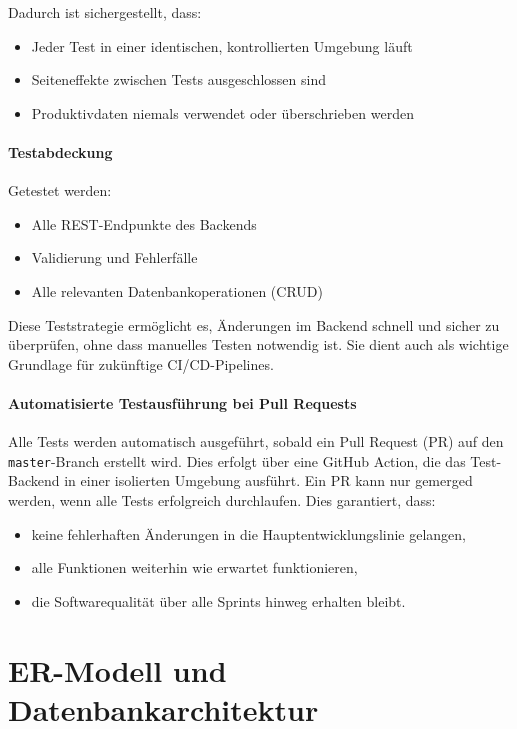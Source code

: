 \documentclass[11pt,a4paper]{article}
\begin{document}
Dadurch ist sichergestellt, dass:
\begin{itemize}
    \item Jeder Test in einer identischen, kontrollierten Umgebung läuft
    \item Seiteneffekte zwischen Tests ausgeschlossen sind
    \item Produktivdaten niemals verwendet oder überschrieben werden
\end{itemize}

\paragraph{Testabdeckung}
Getestet werden:
\begin{itemize}
    \item Alle REST-Endpunkte des Backends
    \item Validierung und Fehlerfälle
    \item Alle relevanten Datenbankoperationen (CRUD)
\end{itemize}

Diese Teststrategie ermöglicht es, Änderungen im Backend schnell und sicher zu überprüfen, ohne dass manuelles Testen notwendig ist. Sie dient auch als wichtige Grundlage für zukünftige CI/CD-Pipelines.

\paragraph{Automatisierte Testausführung bei Pull Requests}
Alle Tests werden automatisch ausgeführt, sobald ein Pull Request (PR) auf den \texttt{master}-Branch erstellt wird. Dies erfolgt über eine GitHub Action, die das Test-Backend in einer isolierten Umgebung ausführt. Ein PR kann nur gemerged werden, wenn alle Tests erfolgreich durchlaufen. Dies garantiert, dass:
\begin{itemize}
    \item keine fehlerhaften Änderungen in die Hauptentwicklungslinie gelangen,
    \item alle Funktionen weiterhin wie erwartet funktionieren,
    \item die Softwarequalität über alle Sprints hinweg erhalten bleibt.
\end{itemize}


\section{ER-Modell und Datenbankarchitektur}
\end{document}

